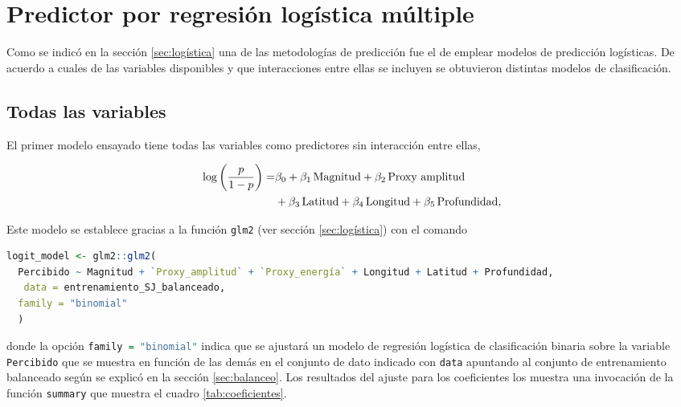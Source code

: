 \documentclass[a4paper]{report}
\begin{document}


\section{Predictor por regresión logística múltiple}

Como se indicó en la sección \ref{sec:logística} una de las metodologías de predicción fue el de emplear modelos de predicción logísticas.
De acuerdo a cuales de las variables disponibles y que interacciones entre ellas  se incluyen se obtuvieron distintas modelos de clasificación.


\subsection{Todas las variables}\label{sec:logística_sin_interacción}

El primer modelo ensayado tiene todas las variables como predictores sin interacción entre ellas,

\begin{align}
	\log \left( \frac{p}{1-p} \right) = & \beta_0 
	+ \beta_1\, \text{Magnitud} 
	+ \beta_2 \, \text{Proxy amplitud}\notag\\
	& + \beta_3 \, \text{Latitud} 
	+ \beta_4 \, \text{Longitud} 
	+ \beta_5 \, \text{Profundidad} 
	,
	\label{eq:regresion_logistica}
\end{align}

Este modelo se establece gracias a la función \lstinline[language=R,breaklines=true,basicstyle=\ttfamily]'glm2' (ver sección \ref{sec:logística}) con el comando
\begin{lstlisting}[language=R, breaklines=true]
logit_model <- glm2::glm2(
  Percibido ~ Magnitud + `Proxy_amplitud` + `Proxy_energía` + Longitud + Latitud + Profundidad,
   data = entrenamiento_SJ_balanceado,
  family = "binomial"
  )
\end{lstlisting}
donde la opción \lstinline[language=R,breaklines=true,basicstyle=\ttfamily]'family = "binomial"' indica que se ajustará un modelo de regresión logística de clasificación binaria sobre la variable \lstinline[language=R]|Percibido| que se muestra en función de las demás en el conjunto de dato indicado con \lstinline[language=R]|data| apuntando al conjunto de entrenamiento balanceado según se explicó en la sección \ref{sec:balanceo}.
Los resultados del ajuste para los coeficientes los muestra una invocación de la función \lstinline[language=R,breaklines=true,basicstyle=\ttfamily]'summary' que muestra el cuadro \ref{tab:coeficientes}. 
\end{document}
